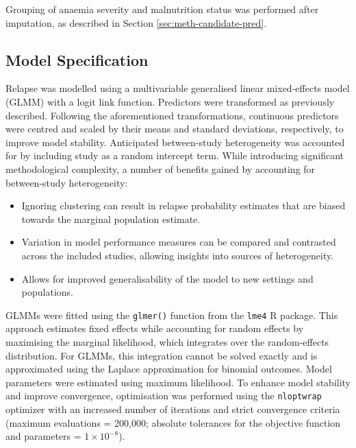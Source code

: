Grouping of anaemia severity and malnutrition status was performed after imputation, as described in Section \ref{sec:meth-candidate-pred}.

\subsection{\label{sec:meth-ms}Model Specification}

Relapse was modelled using a multivariable generalised linear mixed-effects model (GLMM) with a logit link function. Predictors were transformed as previously described. Following the aforementioned transformations, continuous predictors were centred and scaled by their means and standard deviations, respectively, to improve model stability. Anticipated between-study heterogeneity was accounted for by including study as a random intercept term\cite{bouwmeester2013A}. While introducing significant methodological complexity, a number of benefits gained by accounting for between-study heterogeneity\cite{debray2023}:

\begin{itemize}
  \item Ignoring clustering can result in relapse probability estimates that are biased towards the marginal population estimate\cite{wynants2018}.
  \item Variation in model performance measures can be compared and contrasted across the included studies, allowing insights into sources of heterogeneity\cite{steyerberg2019}.
  \item Allows for improved generalisability of the model to new settings and populations\cite{debray2023,steyerberg2019}.
\end{itemize}

GLMMs were fitted using the \texttt{glmer()} function from the \texttt{lme4} R package\cite{bates2015}. This approach estimates fixed effects while accounting for random effects by maximising the marginal likelihood, which integrates over the random-effects distribution. For GLMMs, this integration cannot be solved exactly and is approximated using the Laplace approximation for binomial outcomes. Model parameters were estimated using maximum likelihood. To enhance model stability and improve convergence, optimisation was performed using the \texttt{nloptwrap} optimizer with an increased number of iterations and strict convergence criteria (maximum evaluations = 200,000; absolute tolerances for the objective function and parameters = $1\times10^{-8}$).

